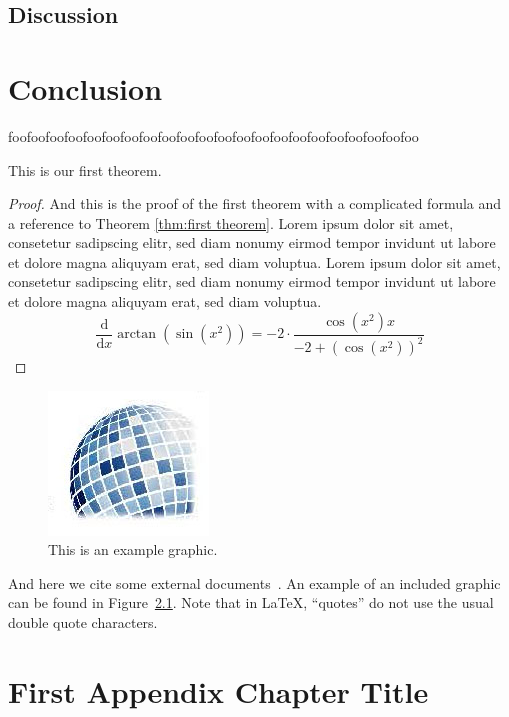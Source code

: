 \documentclass[a4paper, oneside]{discothesis}
\begin{document}
\section{Discussion}

\chapter{Conclusion}
foofoofoofoofoofoofoofoofoofoofoofoofoofoofoofoofoofoofoofoofoofoo

\begin{theorem} \label{thm:first theorem}
	This is our first theorem.
\end{theorem}

\begin{proof}
	And this is the proof of the first theorem with a complicated formula and a reference to Theorem \ref{thm:first theorem}. Lorem ipsum dolor sit amet, consetetur sadipscing elitr, sed diam nonumy eirmod tempor invidunt ut labore et dolore magna aliquyam erat, sed diam voluptua. Lorem ipsum dolor sit amet, consetetur sadipscing elitr, sed diam nonumy eirmod tempor invidunt ut labore et dolore magna aliquyam erat, sed diam voluptua.
	\begin{equation}
		{\frac {\mathrm d}{\mathrm dx}}\arctan(\sin({x}^{2}))=-2 \cdot {\frac {\cos({x}^{2})x}{-2+\left (\cos({x}^{2})\right )^{2}}}
	\end{equation}
\end{proof}

\begin{figure}
    \centering
    \includegraphics[width=0.2\columnwidth]{figures/disco_logo_faded}
    \caption{This is an example graphic.}
    \label{fig:example_figure}
\end{figure}

And here we cite some external documents~\cite{TestReference, TestReference2}.
An example of an included graphic can be found in Figure~\ref{fig:example_figure}.
Note that in \LaTeX, ``quotes'' do not use the usual double quote characters.




\appendix
\chapter{First Appendix Chapter Title}
\end{document}
